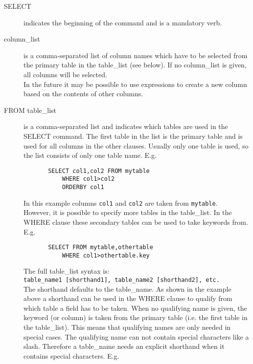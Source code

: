 \begin{description}
  \item[ SELECT ]
       indicates the beginning of the command and is a mandatory verb.
  \item[ column\_list]
       is a comma-separated list of column names which have to be selected
       from the primary table in the table\_list (see below).
       If no column\_list is given, all columns will be selected.
       \\ In the future it may be possible to use expressions to create
       a new column based on the contents of other columns.
  \item[ \label{TAQL:TABLE_LIST}FROM table\_list ]
       is a comma-separated list and indicates which tables are used in
       the SELECT command. The first table in the list is the primary
       table and is used for all columns in the other clauses.
       Usually only one table is used, so the list consists of only one
       table name. E.g.
       \begin{verbatim}
       SELECT col1,col2 FROM mytable
           WHERE col1>col2
           ORDERBY col1
       \end{verbatim}
       In this example columns \texttt{col1} and \texttt{col2}
       are taken from \texttt{mytable}.
       \\However, it is possible to specify more tables in the table\_list.
       In the WHERE clause these secondary tables can be used to take
       keywords from. E.g.
       \begin{verbatim}
       SELECT FROM mytable,othertable
           WHERE col1>othertable.key
       \end{verbatim}
       The full table\_list syntax is:
       \\
       \texttt{table\_name1 [shorthand1], table\_name2 [shorthand2], etc.}
       \\The shorthand defaults to the table\_name.
       As shown in the example above a shorthand can be used in the WHERE
       clause to qualify from which table a field has to be taken.
       When no qualifying name is given, the keyword (or column) is taken
       from the primary table (i.e. the first table in the table\_list).
       This means that qualifying names are only needed in special cases.
       The qualifying name can not contain special characters like a slash.
       Therefore a table\_name needs an explicit shorthand when it contains
       special characters. E.g.
       \begin{verbatim}

\end{verbatim}
\end{description}

